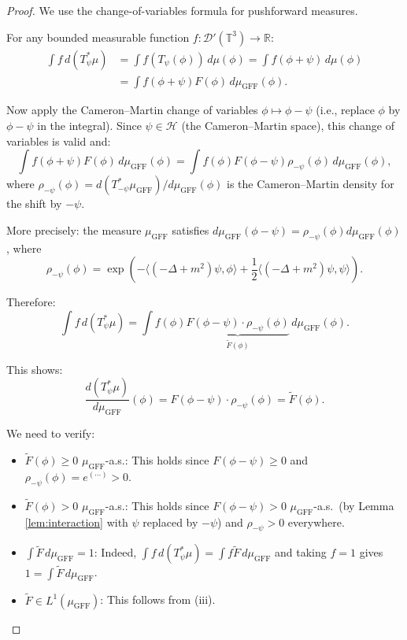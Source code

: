 \documentclass[12pt]{article}
\begin{document}
\begin{proof}
We use the change-of-variables formula for pushforward measures.

For any bounded measurable function $f: \mathcal{D}'(\mathbb{T}^3) \to \mathbb{R}$:
\begin{align*}
\int f \, d(T_\psi^* \mu) &= \int f(T_\psi(\phi)) \, d\mu(\phi) = \int f(\phi + \psi) \, d\mu(\phi) \\
&= \int f(\phi + \psi) F(\phi) \, d\mu_{\mathrm{GFF}}(\phi).
\end{align*}

Now apply the Cameron--Martin change of variables $\phi \mapsto \phi - \psi$ (i.e., replace $\phi$ by $\phi - \psi$ in the integral). Since $\psi \in \mathcal{H}$ (the Cameron--Martin space), this change of variables is valid and:
\[
\int f(\phi + \psi) F(\phi) \, d\mu_{\mathrm{GFF}}(\phi) = \int f(\phi) F(\phi - \psi) \rho_{-\psi}(\phi) \, d\mu_{\mathrm{GFF}}(\phi),
\]
where $\rho_{-\psi}(\phi) = d(T_{-\psi}^* \mu_{\mathrm{GFF}})/d\mu_{\mathrm{GFF}}(\phi)$ is the Cameron--Martin density for the shift by $-\psi$.

More precisely: the measure $\mu_{\mathrm{GFF}}$ satisfies $d\mu_{\mathrm{GFF}}(\phi - \psi) = \rho_{-\psi}(\phi) d\mu_{\mathrm{GFF}}(\phi)$, where
\[
\rho_{-\psi}(\phi) = \exp\!\left(-\langle (-\Delta + m^2)\psi, \phi\rangle + \frac{1}{2}\langle (-\Delta + m^2)\psi, \psi\rangle\right).
\]

Therefore:
\[
\int f \, d(T_\psi^* \mu) = \int f(\phi) \underbrace{F(\phi - \psi) \cdot \rho_{-\psi}(\phi)}_{\tilde{F}(\phi)} \, d\mu_{\mathrm{GFF}}(\phi).
\]

This shows:
\begin{equation}\label{eq:RN-Tpsi-mu}
\frac{d(T_\psi^* \mu)}{d\mu_{\mathrm{GFF}}}(\phi) = F(\phi - \psi) \cdot \rho_{-\psi}(\phi) = \tilde{F}(\phi).
\end{equation}

We need to verify:
\begin{itemize}
\item[(i)] $\tilde{F}(\phi) \geq 0$ $\mu_{\mathrm{GFF}}$-a.s.: This holds since $F(\phi - \psi) \geq 0$ and $\rho_{-\psi}(\phi) = e^{(\cdots)} > 0$.
\item[(ii)] $\tilde{F}(\phi) > 0$ $\mu_{\mathrm{GFF}}$-a.s.: This holds since $F(\phi - \psi) > 0$ $\mu_{\mathrm{GFF}}$-a.s.\ (by Lemma \ref{lem:interaction} with $\psi$ replaced by $-\psi$) and $\rho_{-\psi} > 0$ everywhere.
\item[(iii)] $\int \tilde{F} \, d\mu_{\mathrm{GFF}} = 1$: Indeed, $\int f \, d(T_\psi^* \mu) = \int f \tilde{F} \, d\mu_{\mathrm{GFF}}$ and taking $f = 1$ gives $1 = \int \tilde{F} \, d\mu_{\mathrm{GFF}}$.
\item[(iv)] $\tilde{F} \in L^1(\mu_{\mathrm{GFF}})$: This follows from (iii).
\end{itemize}


\end{proof}
\end{document}
